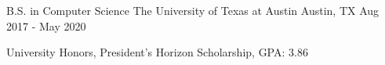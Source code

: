 

\begin{cventries}

  \cventry
  {B.S. in Computer Science} %
  {The University of Texas at Austin} %
  {Austin, TX} %
  {Aug 2017 - May 2020} %
  {
    \begin{cvitems} %
      \item {University Honors, President's Horizon Scholarship, GPA: 3.86}
    \end{cvitems}
  }

\end{cventries}
